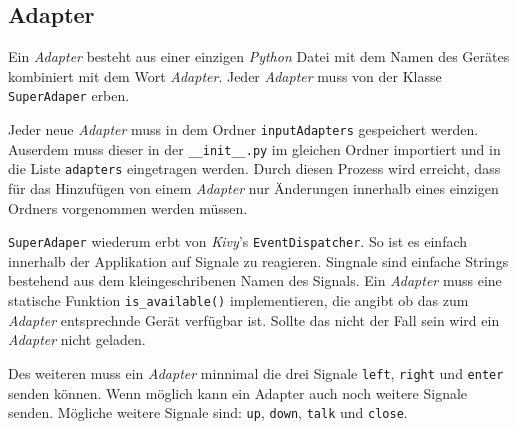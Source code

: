     \subsection{Adapter}
    
    	Ein \emph{Adapter} besteht aus einer einzigen \emph{Python} Datei mit dem Namen des Gerätes kombiniert mit dem Wort \emph{Adapter}. Jeder \emph{Adapter} muss von der Klasse \texttt{SuperAdaper} erben.

		Jeder neue \emph{Adapter} muss in dem Ordner \texttt{inputAdapters} gespeichert werden. Auserdem muss dieser in der \texttt{\_\_init\_\_.py} im gleichen Ordner importiert und in die Liste \texttt{adapters} eingetragen werden. Durch diesen Prozess wird erreicht, dass für das Hinzufügen von einem \emph{Adapter} nur Änderungen innerhalb eines einzigen Ordners vorgenommen werden müssen.

		\texttt{SuperAdaper} wiederum erbt von \emph{Kivy}'s \texttt{EventDispatcher}.
So ist es einfach innerhalb der Applikation auf Signale zu reagieren.
Singnale sind einfache Strings bestehend aus dem kleingeschribenen Namen des Signals. Ein \emph{Adapter} muss eine statische Funktion \texttt{is\_available()} implementieren, die angibt ob das zum \emph{Adapter} entsprechnde Gerät verfügbar ist. Sollte das nicht der Fall sein wird ein \emph{Adapter} nicht geladen.

		Des weiteren muss ein \emph{Adapter} minnimal die drei Signale \texttt{left}, \texttt{right} und \texttt{enter} senden können. Wenn möglich kann ein Adapter auch noch weitere Signale senden. Mögliche weitere Signale sind: \texttt{up}, \texttt{down}, \texttt{talk} und \texttt{close}.
        
	
    \newpage